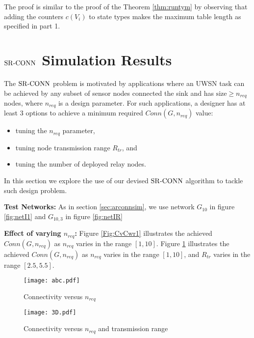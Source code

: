 The proof is similar to the proof of the Theorem \ref{thm:runtym} by observing that adding the counters $c(V_i)$ to state types makes the maximum table length as specified in part 1.

\section{${\mathrm {SR\mbox{-}CONN}}$ Simulation Results}
\label{sec:srconnsim}
The ${\mathrm {SR\mbox{-}CONN}}$ problem is motivated by applications where an UWSN task can be achieved by any subset of sensor nodes connected the sink and has $\textrm{size}\geq n_{req}$ nodes, where $n_{req}$ is a design parameter.
For such applications, a designer has at least 3 options to achieve a minimum required $Conn(G,n_{req})$ value:

\begin{itemize}
\item tuning the $n_{req}$ parameter,
\item tuning node transmission range $R_{tr}$, and
\item tuning the number of deployed relay nodes.
\end{itemize}
In this section we explore the use of our devised ${\mathrm {SR\mbox{-}CONN}}$ algorithm to tackle such design problem.


\textbf{Test Networks:} As in section \ref{sec:arconnsim}, we use network $G_{10}$ in figure \ref{fig:netI1} and $G_{10,3}$ in figure \ref{fig:netIR}


\textbf{Effect of varying $n_{req}$:} Figure \ref{Fig:CvCwr1} illustrates the achieved $Conn(G,n_{req})$ as $n_{req}$ varies in the range $[1,10]$. Figure \ref{Fig:CvCwr2} illustrates the achieved $Conn(G,n_{req})$ as $n_{req}$ varies in the range $[1,10]$, and $R_{tr}$ varies in the range $[2.5,5.5]$.

\begin{figure}[!htb]
\begin{minipage}{0.5\linewidth}
\centering
\texttt{[image: abc.pdf]}
\caption{Connectivity versus $n_{req}$}
\label{Fig:CvCwr1}
\end{minipage}
\begin{minipage}{0.5\linewidth}
\centering
\texttt{[image: 3D.pdf]}
\caption{Connectivity versus $n_{req}$ and transmission range}
\label{Fig:CvCwr2}
\end{minipage}
\end{figure}

